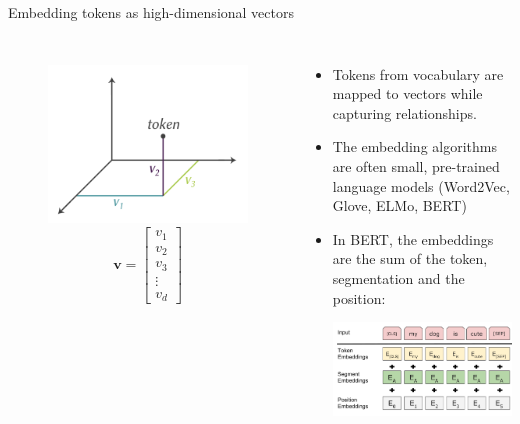 \documentclass[10pt]{beamer}
\begin{document}
\begin{frame}{Embedding tokens as high-dimensional vectors}
	\begin{columns}[T,onlytextwidth]
		\hspace*{-0.7cm} 
		\begin{figure}
			\includegraphics[width=\textwidth]{figures/3D_word_to_vec.png}
			$$
			\mathbf{v} =
			\begin{bmatrix}
				v_1 \\
				v_2 \\
				v_3 \\
				\vdots \\
				v_d
			\end{bmatrix}
			$$
		\end{figure}
		\vspace{0.7cm}
		\begin{itemize}
			\item Tokens from vocabulary are mapped to vectors while capturing relationships. 
			\item The embedding algorithms are often small, pre-trained language models (Word2Vec, Glove, ELMo, BERT)
			\item In BERT, the embeddings are the sum of the token, segmentation and the position: \vspace{0.2cm} \par
			\includegraphics[height=0.3\textheight]{figures/Devlin2018 _BERTfig2.png}
		\end{itemize}
	\end{columns}
\end{frame}
\end{document}
